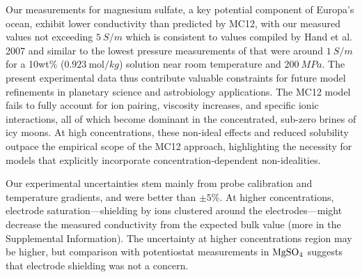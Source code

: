 \documentclass[journal=aesccq,manuscript=article]{achemso}
\begin{document}
Our measurements for magnesium sulfate, a key potential component of Europa's ocean, exhibit lower conductivity than predicted by MC12, with our measured values not exceeding $\SI{5}{S \per m}$ which is consistent to values compiled by Hand et al. 2007\citep{hand2007empirical} and similar to the lowest pressure measurements of \citet{pan2020electrical} that were around $\SI{1}{S \per m}$ for a 10wt\% ($\SI{0.923}{\mol \per kg}$) solution near room temperature and $\SI{200}{MPa}$. 
The present experimental data thus contribute valuable constraints for future model refinements in planetary science and astrobiology applications.
The MC12 model fails to fully account for ion pairing, viscosity increases, and specific ionic interactions, all of which become dominant in the concentrated, sub-zero brines of icy moons. At high concentrations, these non-ideal effects and reduced solubility outpace the empirical scope of the MC12 approach, highlighting the necessity for models that explicitly incorporate concentration-dependent non-idealities.

Our experimental uncertainties stem mainly from probe calibration and temperature gradients, and were better than $\pm5\%$. 
At higher concentrations, electrode saturation---shielding by ions clustered around the electrodes---might decrease the measured conductivity from the expected bulk value (more in the Supplemental Information). 
The uncertainty at higher concentrations region may be higher, but comparison with potentiostat measurements in $\ce{MgSO4}$ suggests that electrode shielding was not a concern.
\end{document}
